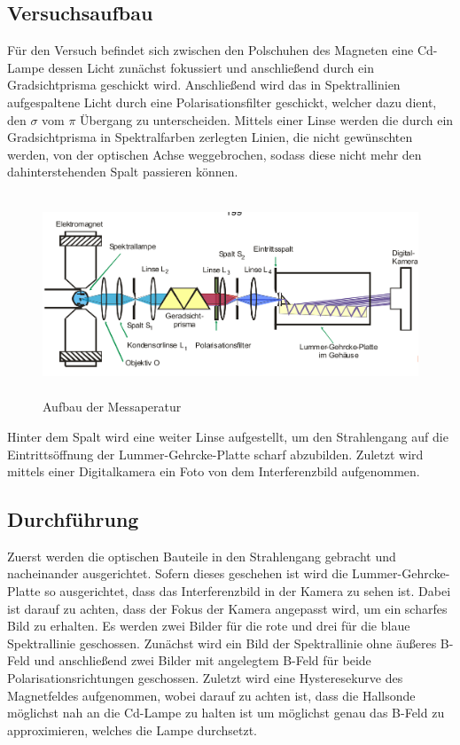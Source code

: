\subsection{Versuchsaufbau}
Für den Versuch befindet sich zwischen den Polschuhen des Magneten eine Cd-Lampe dessen Licht zunächst fokussiert und anschließend durch ein Gradsichtprisma geschickt wird. Anschließend wird das in Spektrallinien aufgespaltene Licht durch eine Polarisationsfilter geschickt, welcher dazu dient, den $\sigma$ vom $\pi$ Übergang zu unterscheiden. Mittels einer Linse werden die durch ein Gradsichtprisma in Spektralfarben zerlegten Linien, die nicht gewünschten werden, von der optischen Achse weggebrochen, sodass diese nicht mehr den dahinterstehenden Spalt passieren können.
\begin{figure}[H]
  \centering
  \includegraphics[height=6cm]{Bilder/Aufbau.png}
  \caption{Aufbau der Messaperatur \cite{V27}}
\end{figure}
Hinter dem Spalt wird eine weiter Linse aufgestellt, um den Strahlengang auf die Eintrittsöffnung der Lummer-Gehrcke-Platte scharf abzubilden. Zuletzt wird mittels einer Digitalkamera ein Foto von dem Interferenzbild aufgenommen.

\subsection{Durchführung}
Zuerst werden die optischen Bauteile in den Strahlengang gebracht und nacheinander ausgerichtet. Sofern dieses geschehen ist wird die Lummer-Gehrcke-Platte so ausgerichtet, dass das Interferenzbild in der Kamera zu sehen ist. Dabei ist darauf zu achten, dass der Fokus der Kamera angepasst wird, um ein scharfes Bild zu erhalten. Es werden zwei Bilder für die rote und drei für die blaue Spektrallinie geschossen. Zunächst wird ein Bild der Spektrallinie ohne äußeres B-Feld und anschließend zwei Bilder mit angelegtem B-Feld für beide Polarisationsrichtungen geschossen. Zuletzt wird eine Hysteresekurve des Magnetfeldes aufgenommen, wobei darauf zu achten ist, dass die Hallsonde möglichst nah an die Cd-Lampe zu halten ist um möglichst genau das B-Feld zu approximieren, welches die Lampe durchsetzt.
